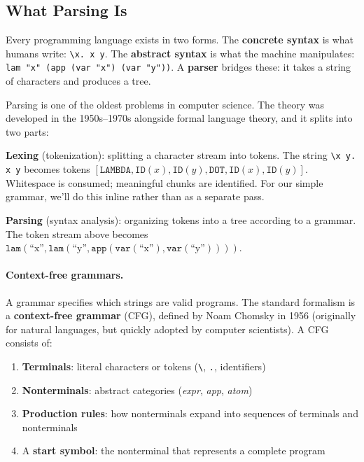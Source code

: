 \documentclass[11pt,a4paper]{article}
\theoremstyle{definition}
\begin{document}
\subsection{What Parsing Is}

Every programming language exists in two forms. The \textbf{concrete syntax}
is what humans write: \verb|\x. x y|. The \textbf{abstract syntax} is what
the machine manipulates: \texttt{lam "x" (app (var "x") (var "y"))}. A
\textbf{parser} bridges these: it takes a string of characters and produces
a tree.

Parsing is one of the oldest problems in computer science. The theory was
developed in the 1950s--1970s alongside formal language theory, and it splits
into two parts:

\textbf{Lexing} (tokenization): splitting a character stream into tokens.
The string \verb*|\x y. x y| becomes tokens
$[\texttt{LAMBDA}, \texttt{ID}(x), \texttt{ID}(y), \texttt{DOT},
\texttt{ID}(x), \texttt{ID}(y)]$. Whitespace is consumed; meaningful chunks
are identified. For our simple grammar, we'll do this inline rather than as a
separate pass.

\textbf{Parsing} (syntax analysis): organizing tokens into a tree according to
a grammar. The token stream above becomes
$\texttt{lam}(\text{``x''}, \texttt{lam}(\text{``y''},
\texttt{app}(\texttt{var}(\text{``x''}), \texttt{var}(\text{``y''}))))$.

\paragraph{Context-free grammars.}
A grammar specifies which strings are valid programs. The standard formalism is
a \textbf{context-free grammar} (CFG), defined by Noam Chomsky in 1956
(originally for natural languages, but quickly adopted by computer scientists).
A CFG consists of:

\begin{enumerate}[leftmargin=2em]
\item \textbf{Terminals}: literal characters or tokens (\verb|\|, \texttt{.},
  identifiers)
\item \textbf{Nonterminals}: abstract categories (\textit{expr}, \textit{app},
  \textit{atom})
\item \textbf{Production rules}: how nonterminals expand into sequences of
  terminals and nonterminals
\item A \textbf{start symbol}: the nonterminal that represents a complete
  program
\end{enumerate}
\end{document}
